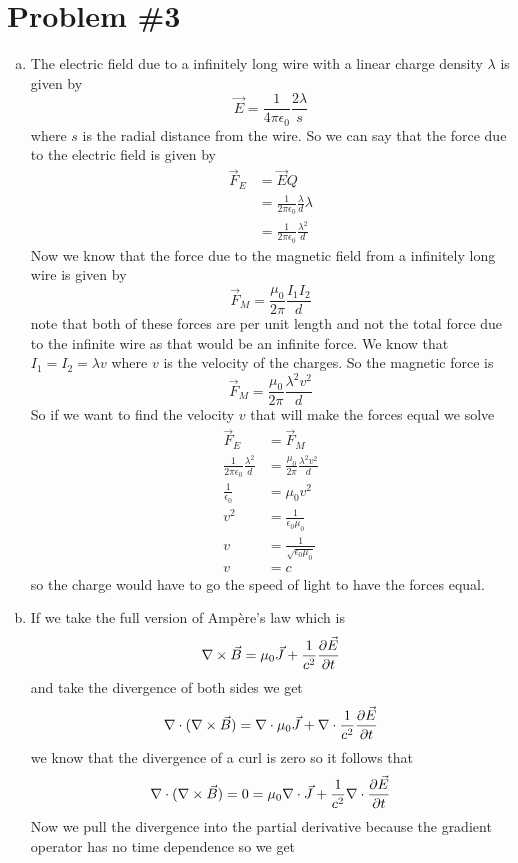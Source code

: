 \documentclass[11pt]{article}
\numberwithin{equation}{section}
\newcommand{\grad}{\bold\nabla}
\newcommand{\kapa}{\frac{1}{4\pi\epsilon_0}}
\begin{document}
\section{Problem \#3}
\begin{enumerate}[(a)]
\item
The electric field due to a infinitely long wire with a linear charge density $\lambda$ is given by 
$$\vec{E} = \kapa\frac{2\lambda}{s}$$
where $s$ is the radial distance from the wire. So we can say that the force due to the electric field is given by
\begin{align*}
\vec{F}_E &= \vec{E}Q\\
&= \frac{1}{2\pi\epsilon_0}\frac{\lambda}{d}\lambda\\
&= \frac{1}{2\pi\epsilon_0}\frac{\lambda^2}{d}
\end{align*}
Now we know that the force due to the magnetic field from a infinitely long wire is given by
$$\vec{F}_M = \frac{\mu_0}{2\pi}\frac{I_1I_2}{d}$$
note that both of these forces are per unit length and not the total force due to the infinite wire as that would be an infinite force. We know that $I_1=I_2=\lambda v$ where $v$ is the velocity of the charges. So the magnetic force is
$$\vec{F}_M = \frac{\mu_0}{2\pi}\frac{\lambda^2v^2}{d}$$
So if we want to find the velocity $v$ that will make the forces equal we solve
\begin{align*}
\vec{F}_E &= \vec{F}_M\\
\frac{1}{2\pi\epsilon_0}\frac{\lambda^2}{d} &= \frac{\mu_0}{2\pi}\frac{\lambda^2v^2}{d}\\
\frac{1}{\epsilon_0} &= {\mu_0}v^2\\
v^2 &= \frac{1}{\epsilon_0\mu_0}\\
v &= \frac{1}{\sqrt{\epsilon_0\mu_0}}\\
v &= c
\end{align*}
so the charge would have to go the speed of light to have the forces equal.
\item
If we take the full version of Amp\`{e}re's law which is 
$$\grad\times\vec{B} = \mu_0\vec{J}+\frac{1}{c^2}\frac{\partial\vec{E}}{\partial t}$$
and take the divergence of both sides we get
$$\grad\cdot(\grad\times\vec{B}) = \grad\cdot\mu_0\vec{J}+\grad\cdot\frac{1}{c^2}\frac{\partial\vec{E}}{\partial t}$$
we know that the divergence of a curl is zero so it follows that
$$\grad\cdot(\grad\times\vec{B})= 0 = \mu_0\grad\cdot\vec{J}+\frac{1}{c^2}\grad\cdot\frac{\partial\vec{E}}{\partial t}$$
Now we pull the divergence into the partial derivative because the gradient operator has no time dependence so we get

\end{enumerate}
\end{document}
